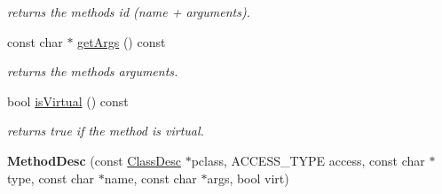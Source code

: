 \begin{DoxyCompactItemize}
\begin{DoxyCompactList}\small\item\em returns the method\textquotesingle{}s id (name + arguments). \end{DoxyCompactList}\item 
const char $\ast$ \hyperlink{classagm_1_1reflection_1_1_method_desc_a049e670af6ab5306b2f2e1139fb57b65}{get\+Args} () const 
\begin{DoxyCompactList}\small\item\em returns the method\textquotesingle{}s arguments. \end{DoxyCompactList}\item 
bool \hyperlink{classagm_1_1reflection_1_1_method_desc_a86d0015e0e94eda49bfa672356b80427}{is\+Virtual} () const 
\begin{DoxyCompactList}\small\item\em returns true if the method is virtual. \end{DoxyCompactList}\item 
{\bfseries Method\+Desc} (const \hyperlink{classagm_1_1reflection_1_1_class_desc}{Class\+Desc} $\ast$pclass, A\+C\+C\+E\+S\+S\+\_\+\+T\+Y\+PE access, const char $\ast$type, const char $\ast$name, const char $\ast$args, bool virt)\hypertarget{classagm_1_1reflection_1_1_method_desc_abbb563439862ed85733a07d253255cc2}{}\label{classagm_1_1reflection_1_1_method_desc_abbb563439862ed85733a07d253255cc2}

\end{DoxyCompactItemize}
